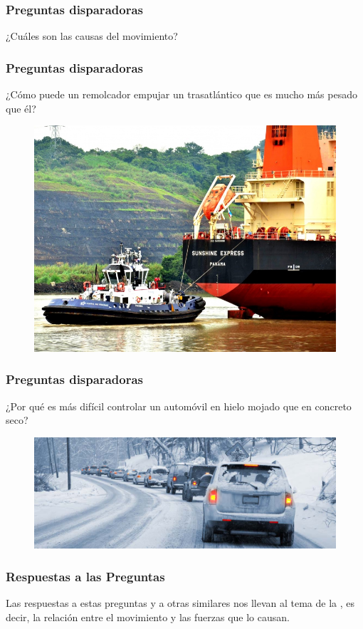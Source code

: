 \documentclass[14pt]{beamer}
\begin{document}
\begin{frame}
\frametitle{Preguntas disparadoras}
¿Cuáles son las causas del movimiento? 
\end{frame}
\begin{frame}
\frametitle{Preguntas disparadoras}
¿Cómo puede un remolcador empujar un trasatlántico que es mucho más pesado que él?
\pause
\begin{figure}
    \centering
    \includegraphics[scale=0.17]{Imagenes/Fuerza_10.jpg}
\end{figure}
\end{frame}
\begin{frame}
\frametitle{Preguntas disparadoras}
¿Por qué es más difícil controlar un automóvil en hielo mojado que en concreto seco?
\begin{figure}
    \centering
    \includegraphics[scale=0.2]{Imagenes/Fuerza_11.jpg}
\end{figure}
\end{frame}
\begin{frame}
\frametitle{Respuestas a las Preguntas}
Las respuestas a estas preguntas y a otras similares nos llevan al tema de la , \pause es decir, la relación entre el movimiento y las fuerzas que lo causan.
\end{frame}
\end{document}
